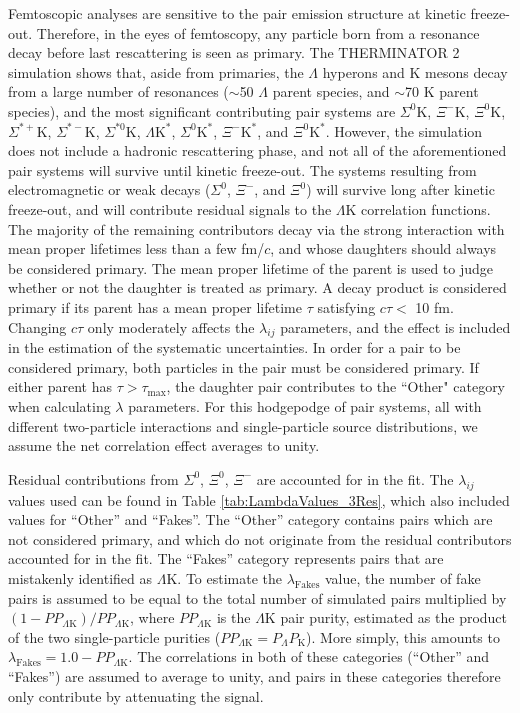 \documentclass[ALICE,manyauthors]{cernphprep}
\newcommand{\Lam}{$\Lambda$\xspace}
\newcommand{\LamK}{$\Lambda$K\xspace}
\begin{document}
Femtoscopic analyses are sensitive to the pair emission structure at kinetic freeze-out.
Therefore, in the eyes of femtoscopy, any particle born from a resonance decay before last rescattering is seen as primary.
The THERMINATOR 2 simulation shows that, aside from primaries, the \Lam hyperons and K mesons decay from a large number of resonances ($\sim$50 \Lam parent species, and $\sim$70 K parent species), and the most significant contributing pair systems are $\Sigma^{0}$K, $\Xi^{-}$K, $\Xi^{0}$K, $\Sigma^{*+}$K, $\Sigma^{*-}$K, $\Sigma^{*0}$K, $\Lambda\mathrm{K}^{*}$, $\Sigma^{0}\mathrm{K}^{*}$, $\Xi^{-}\mathrm{K}^{*}$, and $\Xi^{0}\mathrm{K}^{*}$.
However, the simulation does not include a hadronic rescattering phase, and not all of the aforementioned pair systems will survive until kinetic freeze-out.
The systems resulting from electromagnetic or weak decays ($\Sigma^{0}$, $\Xi^{-}$, and $\Xi^{0}$) will survive long after kinetic freeze-out, and will contribute residual signals to the \LamK correlation functions.
The majority of the remaining contributors decay via the strong interaction with mean proper lifetimes less than a few fm/$c$, and whose daughters should always be considered primary.
The mean proper lifetime of the parent is used to judge whether or not the daughter is treated as primary.
A decay product is considered primary if its parent has a mean proper lifetime $\tau$ satisfying $c\tau <$ 10 fm.
Changing $c\tau$ only moderately affects the $\lambda_{ij}$ parameters, and the effect is included in the estimation of the systematic uncertainties.
In order for a pair to be considered primary, both particles in the pair must be considered primary. 
If either parent has $\tau > \tau_{\mathrm{max}}$, the daughter pair contributes to the ``Other" category when calculating $\lambda$ parameters.
For this hodgepodge of pair systems, all with different two-particle interactions and single-particle source distributions, we assume the net correlation effect averages to unity.


Residual contributions from $\Sigma^{0}$, $\Xi^{0}$, $\Xi^{-}$ are accounted for in the fit.
The $\lambda_{ij}$ values used can be found in Table \ref{tab:LambdaValues_3Res}, which also included values for ``Other'' and ``Fakes''.  
The ``Other'' category contains pairs which are not considered primary, and which do not originate from the residual contributors accounted for in the fit.  
The ``Fakes'' category represents pairs that are mistakenly identified as \LamK.  
To estimate the $\lambda_{\mathrm{Fakes}}$ value, the number of fake pairs is assumed to be equal to the total number of simulated pairs multiplied by $(1-PP_{\Lambda\mathrm{K}})/PP_{\Lambda\mathrm{K}}$, where $PP_{\Lambda\mathrm{K}}$ is the \LamK pair purity, estimated as the product of the two single-particle purities ($PP_{\Lambda\mathrm{K}} = P_{\Lambda}P_{\mathrm{K}}$).
More simply, this amounts to $\lambda_{\mathrm{Fakes}} = 1.0-PP_{\Lambda\mathrm{K}}$.
The correlations in both of these categories (``Other'' and ``Fakes'') are assumed to average to unity, and pairs in these categories therefore only contribute by attenuating the signal. 
\end{document}
